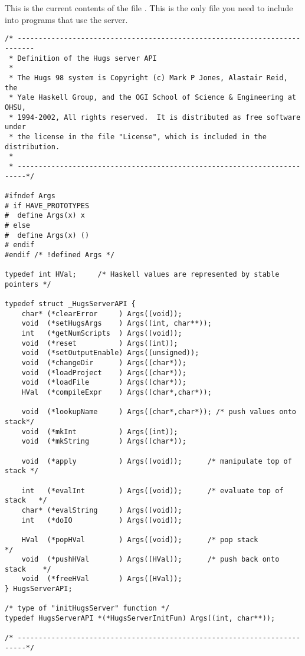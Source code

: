 \appendix

\section{}\label{server.c}

This is the current contents of the file .  This is
the only file you need to include into programs that use the server.

\begin{verbatim}
/* --------------------------------------------------------------------------
 * Definition of the Hugs server API
 *
 * The Hugs 98 system is Copyright (c) Mark P Jones, Alastair Reid, the
 * Yale Haskell Group, and the OGI School of Science & Engineering at OHSU,
 * 1994-2002, All rights reserved.  It is distributed as free software under
 * the license in the file "License", which is included in the distribution.
 *
 * ------------------------------------------------------------------------*/

#ifndef Args
# if HAVE_PROTOTYPES
#  define Args(x) x
# else
#  define Args(x) ()
# endif
#endif /* !defined Args */

typedef int HVal;     /* Haskell values are represented by stable pointers */

typedef struct _HugsServerAPI {
    char* (*clearError     ) Args((void));
    void  (*setHugsArgs    ) Args((int, char**));
    int   (*getNumScripts  ) Args((void));
    void  (*reset          ) Args((int));
    void  (*setOutputEnable) Args((unsigned));
    void  (*changeDir      ) Args((char*));
    void  (*loadProject    ) Args((char*));
    void  (*loadFile       ) Args((char*));
    HVal  (*compileExpr    ) Args((char*,char*));

    void  (*lookupName     ) Args((char*,char*)); /* push values onto stack*/
    void  (*mkInt          ) Args((int));
    void  (*mkString       ) Args((char*));

    void  (*apply          ) Args((void));      /* manipulate top of stack */

    int   (*evalInt        ) Args((void));      /* evaluate top of stack   */
    char* (*evalString     ) Args((void));
    int   (*doIO           ) Args((void));

    HVal  (*popHVal        ) Args((void));      /* pop stack               */
    void  (*pushHVal       ) Args((HVal));      /* push back onto stack    */
    void  (*freeHVal       ) Args((HVal)); 
} HugsServerAPI;

/* type of "initHugsServer" function */
typedef HugsServerAPI *(*HugsServerInitFun) Args((int, char**));

/* ------------------------------------------------------------------------*/

\end{verbatim}


